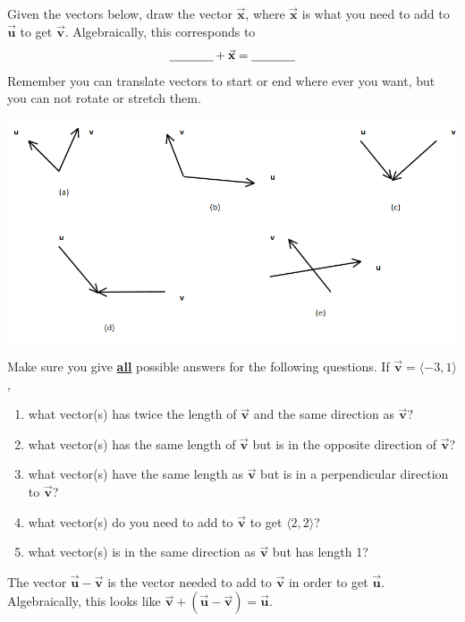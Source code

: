 \bq Given the vectors below, draw the vector $\vec{\textbf{x}}$, where $\vec{\textbf{x}}$ is what you need to add to $\vec{\textbf{u}}$ to get $\vec{\textbf{v}}$. Algebraically, this corresponds to $$\underline{\hspace{.5in}} + \vec{\textbf{x}}= \underline{\hspace{.5in}}$$
Remember you can translate vectors to start or end where ever you want, but you can not rotate or stretch them.

\begin{center} \includegraphics[scale=.6]{vectorarray.png} \end{center}
\eq

\bq Make sure you give \underline{\textbf{all}} possible answers for the following questions. If $\vec{\textbf{v}}= \langle -3,1\rangle $,\begin{enumerate}
\item what vector(s) has twice the length of $\vec{\textbf{v}}$ and the same direction as $\vec{\textbf{v}}$?
\item what vector(s) has the same length of $\vec{\textbf{v}}$ but is in the opposite direction of $\vec{\textbf{v}}$?
\item what vector(s) have the same length as $\vec{\textbf{v}}$ but is in a perpendicular direction to $\vec{\textbf{v}}$?
\item what vector(s) do you need to add to $\vec{\textbf{v}}$ to get $\langle 2,2 \rangle$?
\item what vector(s) is in the same direction as $\vec{\textbf{v}}$ but has length 1?
\end{enumerate}
\eq

\begin{info} The vector $\vec{\textbf{u}}- \vec{\textbf{v}}$ is the vector needed to add to $\vec{\textbf{v}}$ in order to get $\vec{\textbf{u}}$. Algebraically, this looks like $\vec{\textbf{v}} +(\vec{\textbf{u}}- \vec{\textbf{v}})=\vec{\textbf{u}}$.
\end{info}

